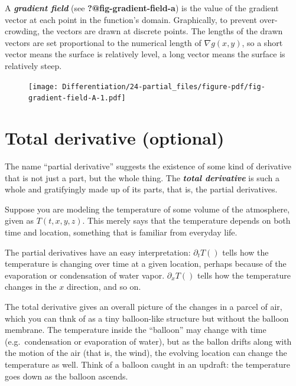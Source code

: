 \documentclass[
  letterpaper,
  DIV=11,
  numbers=noendperiod,
  oneside]{scrreprt}
\begin{document}
A \textbf{\emph{gradient field}} (see \textbf{?@fig-gradient-field-a})
is the value of the gradient vector at each point in the function's
domain. Graphically, to prevent over-crowding, the vectors are drawn at
discrete points. The lengths of the drawn vectors are set proportional
to the numerical length of \(\nabla g(x, y)\), so a short vector means
the surface is relatively level, a long vector means the surface is
relatively steep.

\begin{figure}


{\centering \texttt{[image: Differentiation/24-partial\_files/figure-pdf/fig-gradient-field-A-1.pdf]}

}

\end{figure}

\hypertarget{total-derivative-optional}{%
\section{Total derivative (optional)}\label{total-derivative-optional}}

The name ``partial derivative'' suggests the existence of some kind of
derivative that is not just a part, but the whole thing. The
\textbf{\emph{total derivative}} is such a whole and gratifyingly made
up of its parts, that is, the partial derivatives.

Suppose you are modeling the temperature of some volume of the
atmosphere, given as \(T(t, x, y, z)\). This merely says that the
temperature depends on both time and location, something that is
familiar from everyday life.

The partial derivatives have an easy interpretation: \(\partial_t T()\)
tells how the temperature is changing over time at a given location,
perhaps because of the evaporation or condensation of water vapor.
\(\partial_x T()\) tells how the temperature changes in the \(x\)
direction, and so on.

The total derivative gives an overall picture of the changes in a parcel
of air, which you can thnk of as a tiny balloon-like structure but
without the balloon membrane. The temperature inside the ``balloon'' may
change with time (e.g.~condensation or evaporation of water), but as the
ballon drifts along with the motion of the air (that is, the wind), the
evolving location can change the temperature as well. Think of a balloon
caught in an updraft: the temperature goes down as the balloon ascends.
\end{document}
